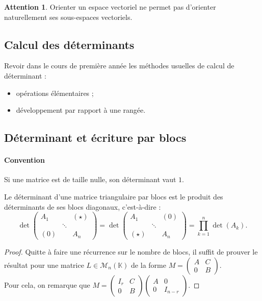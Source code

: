\documentclass[french]{article}
\newcommand{\K}{\mathbb{K}}
\theoremstyle{plain}
\theoremstyle{definition}
\newtheorem*{attention}{Attention}
\theoremstyle{remark}
\begin{document}
\begin{attention}
	Orienter un espace vectoriel ne permet pas d'orienter naturellement ses sous-espaces vectoriels.
\end{attention}

\subsection{Calcul des déterminants}

Revoir dans le cours de première année les méthodes usuelles de calcul de déterminant :
\begin{itemize}
	\item opérations élémentaires ;
	\item développement par rapport à une rangée. %
\end{itemize}

\subsection{Déterminant et écriture par blocs}

\paragraph{Convention} Si une matrice est de taille nulle, son déterminant vaut $1$.

\begin{prop}%
	Le déterminant d'une matrice triangulaire par blocs est le produit des déterminants de ses blocs diagonaux, c'est-à-dire :
	$$\det\begin{pmatrix}
		A_1&&(\star)\\
		&\ddots&\\
		(0)&&A_n
	\end{pmatrix}=\det\begin{pmatrix}
	A_1&&(0)\\
	&\ddots&\\
	(\star)&&A_n
	\end{pmatrix}=\prod_{k=1}^{n}\det(A_k).$$
\end{prop}

\begin{proof}
	Quitte à faire une récurrence sur le nombre de blocs, il suffit de prouver le résultat pour une matrice $L\in\mathcal{M}_n(\K)$ de la forme $M=\begin{pmatrix}
		A&C\\
		0&B
	\end{pmatrix}$.\\
	Pour cela, on remarque que $M=\begin{pmatrix}
		I_r&C\\
		0&B
	\end{pmatrix}\begin{pmatrix}
	A&0\\
	0&I_{n-r}
	\end{pmatrix}$.
\end{proof}
\end{document}
